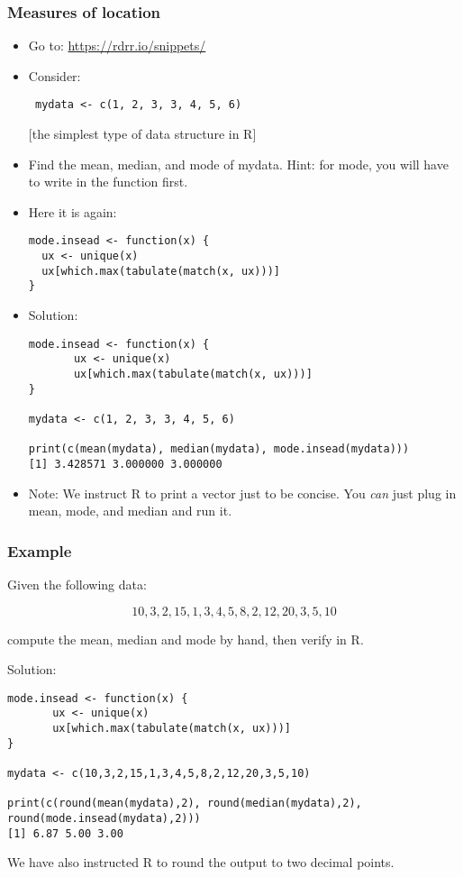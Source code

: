 \documentclass[xcolor=dvipsnames]{beamer} %
\begin{document}
\begin{frame}[fragile]
\frametitle{Measures of location}
\begin{scriptsize}
\begin{itemize}
\item Go to: \href{https://rdrr.io/snippets/}{\textcolor{insead_light}{https://rdrr.io/snippets/}} 
\item Consider: \begin{verbatim} mydata <- c(1, 2, 3, 3, 4, 5, 6) \end{verbatim}
\item[] [the simplest type of data structure in \textsf{R}]
\item Find the mean, median, and mode of mydata. Hint: for mode, you will have to write in the function first. 
\item Here it is again: 
\begin{verbatim}
mode.insead <- function(x) {
  ux <- unique(x)
  ux[which.max(tabulate(match(x, ux)))]
}
\end{verbatim}
\item Solution:
\begin{verbatim}  
mode.insead <- function(x) {
       ux <- unique(x)
       ux[which.max(tabulate(match(x, ux)))]
}

mydata <- c(1, 2, 3, 3, 4, 5, 6)

print(c(mean(mydata), median(mydata), mode.insead(mydata)))
[1] 3.428571 3.000000 3.000000
\end{verbatim}
\item Note: We instruct \textcolor{dark_red}{\textsf{R}} to print a vector just to be concise. You \emph{can} just plug in mean, mode, and median and run it. 
\end{itemize}
\end{scriptsize}
\end{frame}

\begin{frame}[fragile]
\frametitle{Example}
\begin{scriptsize}
Given the following data: 

$$ 10, 3, 2, 15, 1, 3, 4, 5, 8, 2, 12, 20, 3, 5, 10 $$

compute the mean, median and mode by hand, then verify in \textcolor{dark_red}{\textsf{R}}. 

\pause 
\vspace{0.5cm}
Solution: 
\begin{verbatim}
mode.insead <- function(x) {
       ux <- unique(x)
       ux[which.max(tabulate(match(x, ux)))]
}

mydata <- c(10,3,2,15,1,3,4,5,8,2,12,20,3,5,10)

print(c(round(mean(mydata),2), round(median(mydata),2), 
round(mode.insead(mydata),2)))
[1] 6.87 5.00 3.00
\end{verbatim} 
We have also instructed \textcolor{dark_red}{\textsf{R}} to round the output to two decimal points.
\end{scriptsize}
\end{frame}
\end{document}
